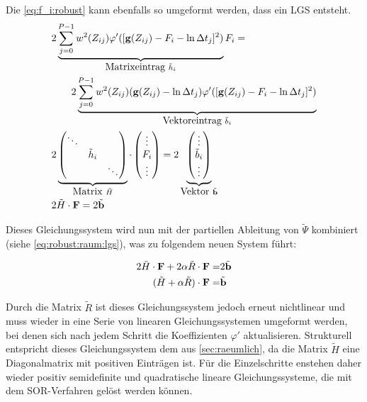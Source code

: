 Die \autoref{eq:f_i:robust} kann ebenfalls so umgeformt werden, dass ein LGS entsteht. 
\begin{align}
    & 2 \underbrace{
        \sum_{j=0}^{P-1} 
            w^2(Z_{ij})
            \varphi'(
                [\mathbf g(Z_{ij})-F_i - \ln \Delta t_j]^2
            )
    }_{\mbox{Matrixeintrag }\tilde h_i}
    F_i = \nonumber \\
    &\qquad 2 \underbrace{
        \sum_{j=0}^{P-1} 
            w^2(Z_{ij})
            (\mathbf g(Z_{ij})-\ln \Delta t_j)
            \varphi'(
                [\mathbf g(Z_{ij})-F_i - \ln \Delta t_j]^2
            )
    }_{\mbox{Vektoreintrag } \tilde b_i}\\
    &
    2 \underbrace{
        \begin{pmatrix}
            \ddots & &\\
            & \tilde h_i & \\
            & & \ddots
        \end{pmatrix}
    }_{\mbox{Matrix }\tilde H}
    \cdot
    \begin{pmatrix}
        \vdots\\ F_i \\ \vdots
    \end{pmatrix}
    =
    2 \underbrace{
        \begin{pmatrix}
            \vdots\\ \tilde b_i \\ \vdots    
        \end{pmatrix}
    }_{\mbox{Vektor }\tilde{\mathbf b}}\\
    & 2 \tilde H \cdot \mathbf F = 2 \tilde{\mathbf{b}}
\end{align}

Dieses Gleichungssystem wird nun mit der partiellen Ableitung von $\tilde \Psi$ kombiniert (siehe \autoref{eq:robust:raum:lgs}), was zu folgendem neuen System führt:

\begin{align}
2 \tilde H \cdot \mathbf F + 2 \alpha \tilde R\cdot \mathbf F =& 2 \tilde{\mathbf b} \\
(\tilde H+\alpha \tilde R)\cdot \mathbf F =& \tilde{\mathbf b}
\end{align}

Durch die Matrix $\tilde R$ ist dieses Gleichungssystem jedoch erneut nichtlinear und muss wieder in eine Serie von linearen Gleichungssystemen umgeformt werden, bei denen sich nach jedem Schritt die Koeffizienten $\varphi'$ aktualisieren. Strukturell entspricht dieses Gleichungssystem dem aus \autoref{sec:raeumlich}, da die Matrix $\tilde H$ eine Diagonalmatrix mit positiven Einträgen ist. Für die Einzelschritte enstehen daher wieder positiv semidefinite und quadratische lineare Gleichungssysteme, die mit dem \gls{SOR}-Verfahren gelöst werden können.


